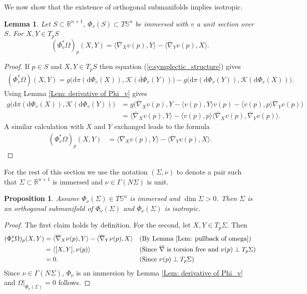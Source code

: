 \documentclass[12pt]{amsart}
\theoremstyle{plain}
\newtheorem{Lem}{Lemma}
\newtheorem{Prop}{Proposition}
\theoremstyle{definition}
\def\R{\mathbb{R}}
\def\S{\mathbb{S}}
\newcommand{\td}{\mathrm{d}}
\numberwithin{equation}{section}
\begin{document}
We now show that the existence of orthogonal submanifolds implies isotropic.
\begin{Lem} \label{Lem: pullback of omega} Let $S\subset\R^{n+1}$, $\Phi_v(S)\subset T\S^n$ be immersed with $v$ a unit section over $S$. For $X,Y\in T_pS$
\[
(\Phi_v^\ast\Omega)_p(X,Y)=\langle \overline\nabla_X v(p), Y \rangle-\langle \overline\nabla_Y v(p), X \rangle.
\]
\end{Lem}
\begin{proof}
If $p\in S$ and $X,Y\in T_pS$ then equation (\ref{e:symplectic_structure}) gives
    \begin{align*}
    (\Phi_v^\ast \Omega)(X,Y)=g\Big(\td\pi(\td\Phi_v(X)),\mathcal{K}(\td\Phi_v(Y))\Big)-g\Big(\td\pi(\td\Phi_v(Y)),\mathcal{K}(\td\Phi_v(X))\big).
    \end{align*}
    Using Lemma \ref{Lem: derivative of Phi_v} gives
    \begin{align*}
    g\Big(\td\pi(\td\Phi_v(X)),\mathcal{K}(\td\Phi_v(Y))\Big)&=g\Big(\overline\nabla_Xv(p), Y-\langle v(p),Y\rangle v(p)-\langle v(p),p\rangle \overline\nabla_Y v(p) \Big)\\&=\langle \overline\nabla_X v(p), Y \rangle-\langle v(p),p\rangle \langle \overline\nabla_X v(p),\overline\nabla_Y v(p) \rangle.
    \end{align*}
    A similar calculation with $X$ and $Y$ exchanged leads to the formula
    \begin{align*}
    (\Phi_v^\ast \Omega)_p(X,Y)&=\langle \overline\nabla_X v(p), Y \rangle-\langle \overline\nabla_Y v(p), X \rangle.
    \end{align*}
\end{proof}
For the rest of this section we use the notation $(\Sigma,\nu)$ to denote a pair such that $\Sigma\subset\R^{n+1}$ is immersed and $\nu\in\Gamma(N\Sigma)$ is unit.
\begin{Prop} \label{prop: orthogonal implies isotropic}
    Assume $\Phi_\nu(\Sigma)\in T\S^n$ is immersed and $\dim \Sigma>0$. Then $\Sigma$ is an orthogonal submanifold of $\Phi_\nu(\Sigma)$ and $\Phi_\nu(\Sigma)$ is isotropic.
\end{Prop}
\begin{proof}
The first claim holds by definition. For the second, let $X,Y\in T_p\Sigma$. Then
   \begin{align*}
(\Phi_\nu^\ast\Omega)_p(X,Y)&=\langle \overline\nabla_X \nu(p), Y \rangle-\langle \overline\nabla_Y \nu(p), X \rangle &&\text{(By Lemma \ref{Lem: pullback of omega})}\\
&=\langle [X,Y],\nu(p)\rangle &&\text{(Since $\overline{\nabla}$ is torsion free and $\nu(p)\perp T_p\Sigma$)}\\
    &=0. &&\text{(Since $\nu(p)\perp T_p\Sigma$)}
    \end{align*}
    Since $\nu\in\Gamma(N\Sigma)$, $\Phi_\nu$ is an immersion by Lemma \ref{Lem: derivative of Phi_v} and $\Omega|_{\Phi_\nu(\Sigma)}=0$ follows.
\end{proof}
\end{document}
